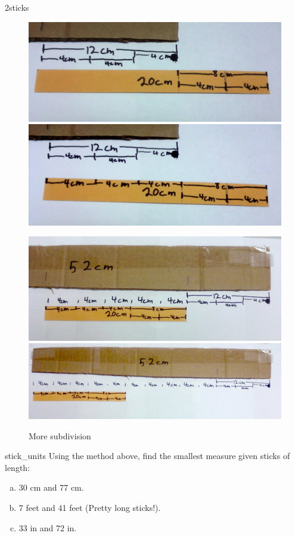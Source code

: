 \begin{example}{2sticks}
\begin{figure}
\begin{center}
	\includegraphics[width=.4900\textwidth]{images/2_sticks_step14.png} \includegraphics[width=.4900\textwidth]{images/2_sticks_step15.png}

	\includegraphics[width=.4900\textwidth]{images/2_sticks_step16.png} \includegraphics[width=.4900\textwidth]{images/2_sticks_step17.png}
	
\end{center}
\caption{More subdivision\label{fig:9}}
\end{figure}

\end{example}

\begin{exercise}{stick_units}
Using the method above, find the smallest measure given sticks of length:
\begin{enumerate}[(a)]
\item
30 cm and 77 cm.
\item
7 feet and 41 feet (Pretty long sticks!).
\item
33 in and 72 in.
\end{enumerate}
\end{exercise} 


